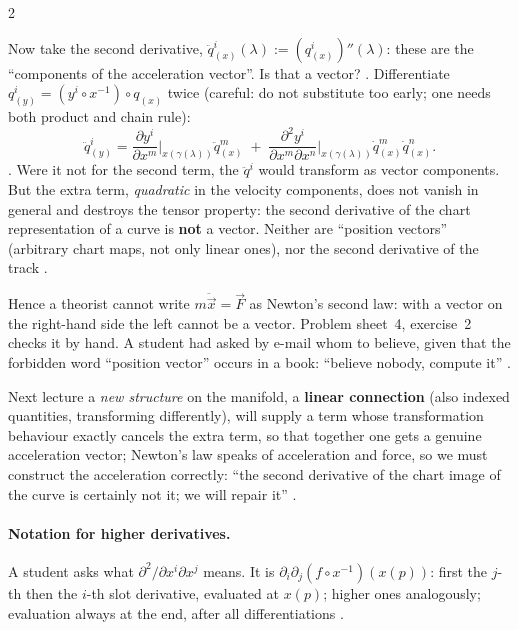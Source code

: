 \begin{paracol}{2}
\begin{example}\label{ex:tf-second}
Now take the second derivative, $\ddot q^i_{(x)}(\lambda):=(q^i_{(x)})''(\lambda)$: these are the ``components of the acceleration
vector''. Is that a vector? .
Differentiate $q^i_{(y)}=(y^i\circ x^{-1})\circ q_{(x)}$ twice (careful: do not substitute too early; one needs both product
and chain rule):
\[
  \ddot q^i_{(y)}
  =\frac{\partial y^i}{\partial x^m}\Big|_{x(\gamma(\lambda))}\ddot q^m_{(x)}
  \;+\;\frac{\partial^2 y^i}{\partial x^m\partial x^n}\Big|_{x(\gamma(\lambda))}\dot q^m_{(x)}\dot q^n_{(x)} .
\]
.
Were it not for the second term, the $\ddot q^i$ would transform as vector components. But the extra term, \emph{quadratic}
in the velocity components, does not vanish in general and destroys the tensor property: the second derivative of the chart
representation of a curve is \textbf{not} a vector. Neither are ``position vectors'' (arbitrary chart maps, not only linear
ones), nor the second derivative of the track .
\end{example}
\begin{aside}[Why Newton's law cannot be $m\ddot x=F$]
Hence a theorist cannot write $m\ddot{\vec x}=\vec F$ as Newton's second law: with a vector on the right-hand side the left
cannot be a vector. Problem sheet~4, exercise~2 checks it by hand. A student had asked by e-mail whom to believe, given
that the forbidden word ``position vector'' occurs in a book: ``believe nobody, compute it''
.
\end{aside}
Next lecture a \emph{new structure} on the manifold, a \textbf{linear connection} (also indexed quantities, transforming
differently), will supply a term whose transformation behaviour exactly cancels the extra term, so that together one gets a
genuine acceleration vector; Newton's law speaks of acceleration and force, so we must construct the acceleration correctly:
``the second derivative of the chart image of the curve is certainly not it; we will repair it'' .

\paragraph{Notation for higher derivatives.} A student asks what $\partial^2/\partial x^i\partial x^j$ means. It is
$\partial_i\partial_j(f\circ x^{-1})(x(p))$: first the $j$-th then the $i$-th slot derivative, evaluated at $x(p)$; higher ones
analogously; evaluation always at the end, after all differentiations .


\end{paracol}
